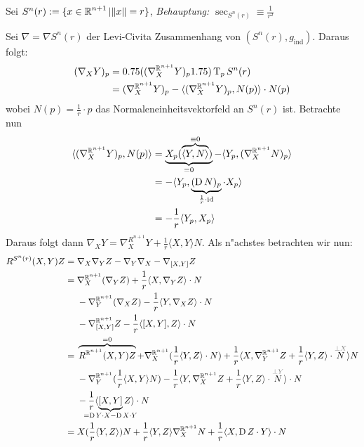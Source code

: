 \begin{Loes}
Sei $S^n(r) := \{x \in \operatorname{\mathbb{R}}^{n+1} | \|x\| = r\}$, \emph{Behauptung:} $\sec_{S^n(r)} \equiv \frac{1}{r^2}$

Sei $\nabla = \nabla S^n(r)$ der Levi-Civita Zusammenhang von $(S^n(r), g_{\text{ind}})$. Daraus folgt:
\begin{align*}
	(\nabla_X Y)_p &= 0.75( (\nabla_X^{\operatorname{\mathbb{R}}^{n+1}} Y)_p 1.75) \operatorname{T}_p S^n(r) \\
	&= (\nabla_X^{\operatorname{\mathbb{R}}^{n+1}} Y)_p - \langle (\nabla_X^{\operatorname{\mathbb{R}}^{n+1}} Y)_p, N(p) \rangle \cdot N(p)
\end{align*}
wobei $N(p) = \frac{1}{r} \cdot p$ das Normaleneinheitsvektorfeld an $S^n(r)$ ist. Betrachte nun
\begin{align*}
	\langle (\nabla_X^{\operatorname{\mathbb{R}}^{n+1}} Y)_p, N(p) \rangle &= \underbrace{X_p ( \overbrace{\langle Y, N \rangle}^{\equiv 0} )}_{=0} - \langle Y_p, (\nabla_X^{\operatorname{\mathbb{R}}^{n+1}} N)_p \rangle\\
	&= - \langle Y_p, \underbrace{(\operatorname{D} N)_p}_{\frac{1}{r}\cdot\operatorname{id}} \cdot X_p \rangle\\
	&= - \frac{1}{r} \langle Y_p, X_p \rangle
\end{align*}
Daraus folgt dann $\nabla_XY = \nabla_X^{R^{n+1}} Y + \frac{1}{r} \langle X, Y \rangle N$. Als n"achstes betrachten wir nun:
\begin{align*}
R^{S^n(r)}(X,Y)Z ={}& \nabla_X \nabla_Y Z - \nabla_Y \nabla_X - \nabla_{[X,Y]}Z\\
={}& \nabla_X^{\R^{n+1}} (\nabla_Y Z) + \frac{1}{r} \langle X, \nabla_Y Z \rangle \cdot N\\
   & - \nabla_Y^{\R^{n+1}} (\nabla_X Z) - \frac{1}{r} \langle Y, \nabla_X Z \rangle \cdot N\\
   & - \nabla_{[X,Y]}^{\R^{n+1}} Z - \frac{1}{r} \langle [X,Y], Z \rangle \cdot N\\
={}& \overbrace{R^{\R^{n+1}} (X,Y)Z}^{=0} + \nabla_X^{\R^{n+1}} (\frac{1}{r} \langle Y, Z \rangle \cdot N) + \frac{1}{r} \langle X, \nabla_Y^{\R^{n+1}} Z + \frac{1}{r} \langle Y, Z \rangle \cdot \overset{\textcolor{gray}{\perp X}}{N} \rangle N\\
   & - \nabla_Y^{\R^{n+1}} ( \frac{1}{r} \langle X, Y \rangle N) - \frac{1}{r} \langle Y, \nabla_X^{\R^{n+1}} Z + \frac{1}{r} \langle Y, Z \rangle \cdot \overset{\textcolor{gray}{\perp Y}}{N} \rangle \cdot N\\
   & - \frac{1}{r} \langle \underbrace{[X,Y]}_{\mathclap{=\D Y \cdot X - \D X \cdot Y}} Z \rangle \cdot N\\
={}& X(\frac{1}{r} \langle Y, Z \rangle) N + \frac{1}{r} \langle Y, Z \rangle \nabla_X^{\R^{n+1}} N + \frac{1}{r} \langle X, \D Z \cdot Y \rangle \cdot N\\

\end{align*}
\end{Loes}
